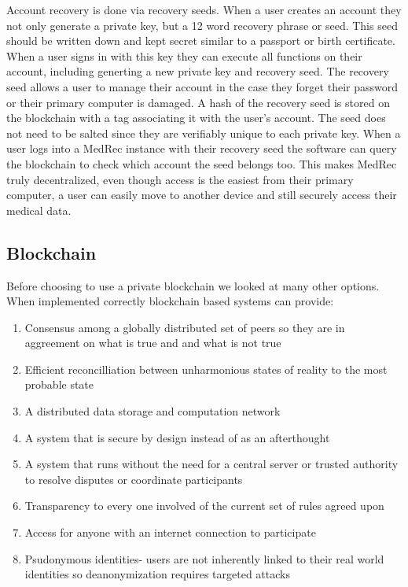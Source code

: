 \documentclass[a4paper]{article}
\begin{document}
    Account recovery is done via recovery seeds. When a user creates an account they not only generate a private key, but a 12 word recovery phrase or seed. This seed should be written down and kept secret similar to a passport or birth certificate. When a user signs in with this key they can execute all functions on their account, including generting a new private key and recovery seed. The recovery seed allows a user to manage their account in the case they forget their password or their primary computer is damaged. A hash of the recovery seed is stored on the blockchain with a tag associating it with the user's account. The seed does not need to be salted since they are verifiably unique to each private key. When a user logs into a MedRec instance with their recovery seed the software can query the blockchain to check which account the seed belongs too. This makes MedRec truly decentralized, even though access is the easiest from their primary computer, a user can easily move to another device and still securely access their medical data.

\subsection{Blockchain}

Before choosing to use a private blockchain we looked at many other options. When implemented correctly blockchain based systems can provide:

\begin{enumerate}

\item Consensus among a globally distributed set of peers so they are in aggreement on what is true and and what is not true

\item Efficient reconcilliation between unharmonious states of reality to the most probable state

\item A distributed data storage and computation network

\item A system that is secure by design instead of as an afterthought

\item A system that runs without the need for a central server or trusted authority to resolve disputes or coordinate participants

\item Transparency to every one involved of the current set of rules agreed upon

\item Access for anyone with an internet connection to participate

\item Psudonymous identities- users are not inherently linked to their real world identities so deanonymization requires targeted attacks

\end{enumerate}
\end{document}
